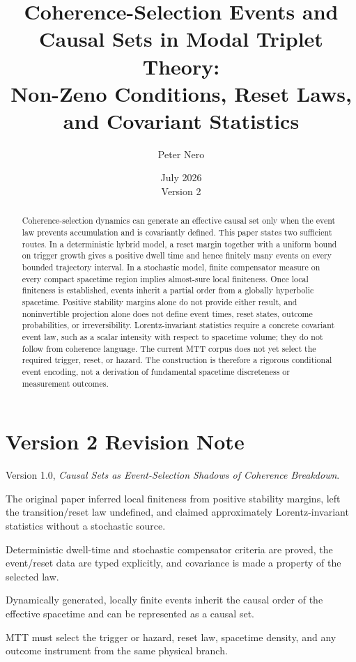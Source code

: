 \documentclass[11pt]{article}
\title{Coherence-Selection Events and Causal Sets in Modal Triplet Theory:\\
\large Non-Zeno Conditions, Reset Laws, and Covariant Statistics}
\author{Peter Nero}
\date{July 2026\\Version 2}
\theoremstyle{definition}
\theoremstyle{remark}
\begin{document}
\maketitle

\begin{abstract}
Coherence-selection dynamics can generate an effective causal set only when
the event law prevents accumulation and is covariantly defined. This paper
states two sufficient routes. In a deterministic hybrid model, a reset
margin together with a uniform bound on trigger growth gives a positive
dwell time and hence finitely many events on every bounded trajectory
interval. In a stochastic model, finite compensator measure on every compact
spacetime region implies almost-sure local finiteness. Once local finiteness
is established, events inherit a partial order from a globally hyperbolic
spacetime. Positive stability margins alone do not provide either result,
and noninvertible projection alone does not define event times, reset states,
outcome probabilities, or irreversibility. Lorentz-invariant statistics
require a concrete covariant event law, such as a scalar intensity with
respect to spacetime volume; they do not follow from coherence language.
The current MTT corpus does not yet select the required trigger, reset, or
hazard. The construction is therefore a rigorous conditional event
encoding, not a derivation of fundamental spacetime discreteness or
measurement outcomes.
\end{abstract}

\section*{Version 2 Revision Note}
\begin{description}[leftmargin=3.2cm,style=nextline]
\item[Supersedes] Version 1.0, \emph{Causal Sets as Event-Selection Shadows
of Coherence Breakdown}.
\item[Reason] The original paper inferred local finiteness from positive
stability margins, left the transition/reset law undefined, and claimed
approximately Lorentz-invariant statistics without a stochastic source.
\item[Resolution] Deterministic dwell-time and stochastic compensator
criteria are proved, the event/reset data are typed explicitly, and
covariance is made a property of the selected law.
\item[Retained result] Dynamically generated, locally finite events inherit
the causal order of the effective spacetime and can be represented as a
causal set.
\item[Remaining boundary] MTT must select the trigger or hazard, reset law,
spacetime density, and any outcome instrument from the same physical branch.
\end{description}
\end{document}
